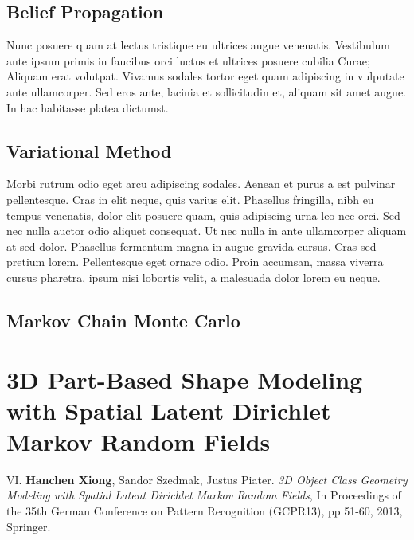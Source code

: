 \subsection{Belief Propagation}

Nunc posuere quam at lectus tristique eu ultrices augue venenatis. Vestibulum ante ipsum primis in faucibus orci luctus et ultrices posuere cubilia Curae; Aliquam erat volutpat. Vivamus sodales tortor eget quam adipiscing in vulputate ante ullamcorper. Sed eros ante, lacinia et sollicitudin et, aliquam sit amet augue. In hac habitasse platea dictumst.


\subsection{Variational Method}
Morbi rutrum odio eget arcu adipiscing sodales. Aenean et purus a est pulvinar pellentesque. Cras in elit neque, quis varius elit. Phasellus fringilla, nibh eu tempus venenatis, dolor elit posuere quam, quis adipiscing urna leo nec orci. Sed nec nulla auctor odio aliquet consequat. Ut nec nulla in ante ullamcorper aliquam at sed dolor. Phasellus fermentum magna in augue gravida cursus. Cras sed pretium lorem. Pellentesque eget ornare odio. Proin accumsan, massa viverra cursus pharetra, ipsum nisi lobortis velit, a malesuada dolor lorem eu neque.


\subsection{Markov Chain Monte Carlo}



\section{3D Part-Based Shape Modeling with Spatial Latent Dirichlet Markov Random Fields}
\begin{shaded}
{\Huge VI.} \textbf{Hanchen Xiong}, Sandor Szedmak, Justus Piater. {\it 3D Object Class Geometry Modeling with Spatial Latent Dirichlet Markov Random Fields}, In Proceedings of the 35th German Conference on Pattern Recognition (GCPR13), pp 51-60, 2013,  Springer.  
\vspace{-.2cm}

\end{shaded}

